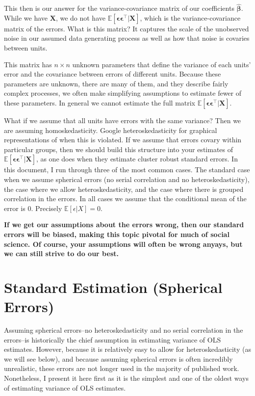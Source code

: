 \documentclass[]{article}
\begin{document}
This then is our answer for the variance-covariance matrix of our
coefficients \(\hat{\bm{\beta}}\). While we have \(\mathbf{X}\), we do
not have \(\mathbb{E}[\bm{\epsilon}\bm{\epsilon}^\top |\mathbf{X}]\),
which is the variance-covariance matrix of the errors. What is this
matrix? It captures the scale of the unobserved noise in our assumed
data generating process as well as how that noise is covaries between
units.

This matrix has \(n \times n\) unknown parameters that define the
variance of each units' error and the covariance between errors of
different units. Because these parameters are unknown, there are many of
them, and they describe fairly complex processes, we often make
simplifying assumptions to estimate fewer of these parameters. In
general we cannot estimate the full matrix
\(\mathbb{E}[\bm{\epsilon}\bm{\epsilon}^\top |\mathbf{X}]\).

What if we assume that all units have errors with the same variance?
Then we are assuming homoskedasticity. Google heteroskedasticity for
graphical representations of when this is violated. If we assume that
errors covary within particular groups, then we should build this
structure into your estimates of
\(\mathbb{E}[\bm{\epsilon}\bm{\epsilon}^\top |\mathbf{X}]\), as one does
when they estimate cluster robust standard errors. In this document, I
run through three of the most common cases. The standard case when we
assume spherical errors (no serial correlation and no
heteroskedasticity), the case where we allow heteroskedasticity, and the
case where there is grouped correlation in the errors. In all cases we
assume that the conditional mean of the error is \(0\). Precisely
\(\mathbb{E}[\epsilon|X] = 0\).

\textbf{If we get our assumptions about the errors wrong, then our
standard errors will be biased, making this topic pivotal for much of
social science. Of course, your assumptions will often be wrong anyays,
but we can still strive to do our best.}

\hypertarget{standard-estimation-spherical-errors}{%
\section{Standard Estimation (Spherical
Errors)}\label{standard-estimation-spherical-errors}}

Assuming spherical errors--no heteroskedasticity and no serial
correlation in the errors--is historically the chief assumption in
estimating variance of OLS estimates. However, because it is relatively
easy to allow for heteroskedasticity (as we will see below), and because
assuming spherical errors is often incredibly unrealistic, these errors
are not longer used in the majority of published work. Nonetheless, I
present it here first as it is the simplest and one of the oldest ways
of estimating variance of OLS estimates.
\end{document}
